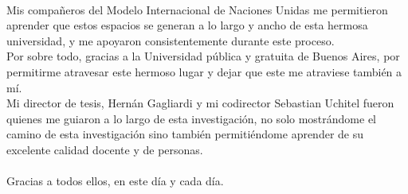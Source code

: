 \\
\noindent Mis compañeros del Modelo Internacional de Naciones Unidas me permitieron aprender que estos espacios se generan a lo largo y ancho de esta hermosa universidad, y me apoyaron consistentemente durante este proceso.
\\
Por sobre todo, gracias a la Universidad pública y gratuita de Buenos Aires, por permitirme atravesar este hermoso lugar y dejar que este me atraviese también a mí.
\\
\noindent Mi director de tesis, Hernán Gagliardi y mi codirector Sebastian Uchitel fueron quienes me guiaron a lo largo de esta investigación, no solo mostrándome el camino de esta investigación sino también permitiéndome aprender de su excelente calidad docente y de personas.  
\\
\\
\noindent Gracias a todos ellos, en este día y cada día.